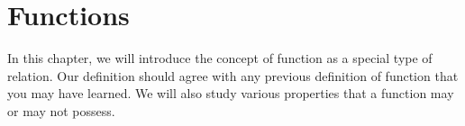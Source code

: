 \chapter{Functions}\label{chap:Functions}


In this chapter, we will introduce the concept of function as a special type of relation.  Our definition should agree with any previous definition of function that you may have learned.  We will also study various properties that a function may or may not possess.